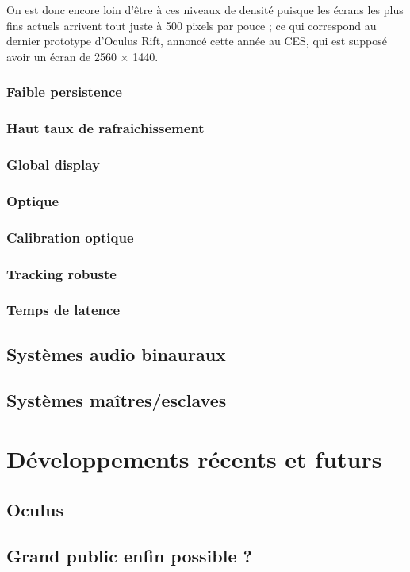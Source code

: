 \documentclass[a4]{scrartcl}
\begin{document}
On est donc encore loin d'être à ces niveaux de densité puisque les écrans les plus fins actuels arrivent tout juste à 500 pixels par pouce ; ce qui correspond au dernier prototype d'Oculus Rift, annoncé cette année au CES, qui est supposé avoir un écran de 2560 $\times$ 1440.

\subsubsection{Faible persistence}



\subsubsection{Haut taux de rafraichissement}


\subsubsection{Global display}


\subsubsection{Optique}


\subsubsection{Calibration optique}


\subsubsection{Tracking robuste}


\subsubsection{Temps de latence}

\cite{Abrash12} \cite{Carmack13} 


\subsection{Systèmes audio binauraux}


\subsection{Systèmes maîtres/esclaves}




\section{Développements récents et futurs}

\subsection{Oculus}
\subsection{Grand public enfin possible ?}


\newpage


\end{document}
